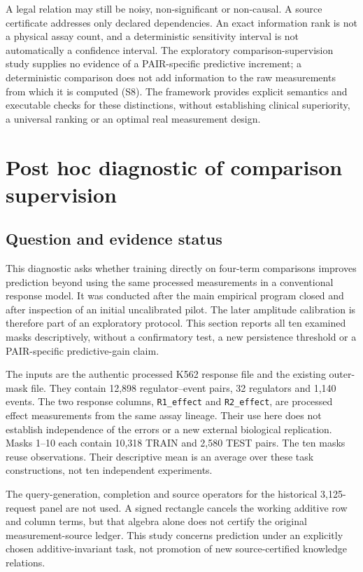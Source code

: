 \documentclass[11pt]{article}
\begin{document}
A legal relation may still be noisy, non-significant or non-causal. A source certificate addresses only declared dependencies. An exact information rank is not a physical assay count, and a deterministic sensitivity interval is not automatically a confidence interval. The exploratory comparison-supervision study supplies no evidence of a PAIR-specific predictive increment; a deterministic comparison does not add information to the raw measurements from which it is computed (S8). The framework provides explicit semantics and executable checks for these distinctions, without establishing clinical superiority, a universal ranking or an optimal real measurement design.



\section{Post hoc diagnostic of comparison supervision}
\label{sec:posthoccomparison}
\subsection{Question and evidence status}
This diagnostic asks whether training directly on four-term comparisons improves prediction beyond using the same processed measurements in a conventional response model. It was conducted after the main empirical program closed and after inspection of an initial uncalibrated pilot. The later amplitude calibration is therefore part of an exploratory protocol. This section reports all ten examined masks descriptively, without a confirmatory test, a new persistence threshold or a PAIR-specific predictive-gain claim.

The inputs are the authentic processed K562 response file and the existing outer-mask file. They contain 12,898 regulator--event pairs, 32 regulators and 1,140 events. The two response columns, \texttt{R1\_effect} and \texttt{R2\_effect}, are processed effect measurements from the same assay lineage. Their use here does not establish independence of the errors or a new external biological replication. Masks 1--10 each contain 10,318 TRAIN and 2,580 TEST pairs. The ten masks reuse observations. Their descriptive mean is an average over these task constructions, not ten independent experiments.

The query-generation, completion and source operators for the historical 3,125-request panel are not used. A signed rectangle cancels the working additive row and column terms, but that algebra alone does not certify the original measurement-source ledger. This study concerns prediction under an explicitly chosen additive-invariant task, not promotion of new source-certified knowledge relations.
\end{document}

